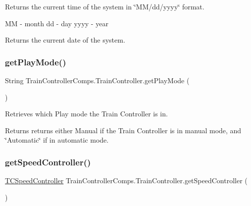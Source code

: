 Returns the current time of the system in \char`\"{}\+M\+M/dd/yyyy\char`\"{} format. 

MM -\/ month dd -\/ day yyyy -\/ year

\begin{DoxyReturn}{Returns}
the current date of the system. 
\end{DoxyReturn}
\mbox{\label{classTrainControllerComps_1_1TrainController_af94f38bb5536923926d19272bfb5f0f2}} 
\subsubsection{\texorpdfstring{get\+Play\+Mode()}{getPlayMode()}}
{\footnotesize\ttfamily String Train\+Controller\+Comps.\+Train\+Controller.\+get\+Play\+Mode (\begin{DoxyParamCaption}{ }\end{DoxyParamCaption})}



Retrieves which Play mode the Train Controller is in. 

\begin{DoxyReturn}{Returns}
returns either Manual if the Train Controller is in manual mode, and \char`\"{}\+Automatic\char`\"{} if in automatic mode. 
\end{DoxyReturn}
\mbox{\label{classTrainControllerComps_1_1TrainController_a563558b783b64d38ec5bc7f2bbd87930}} 
\subsubsection{\texorpdfstring{get\+Speed\+Controller()}{getSpeedController()}}
{\footnotesize\ttfamily \hyperlink{classTrainControllerComps_1_1TCSpeedController}{T\+C\+Speed\+Controller} Train\+Controller\+Comps.\+Train\+Controller.\+get\+Speed\+Controller (\begin{DoxyParamCaption}{ }\end{DoxyParamCaption})}



